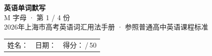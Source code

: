\documentclass[10pt,a4paper]{article}
\begin{document}
\pagestyle{plain}

\begin{center}
{\LARGE\bfseries 英语单词默写}\\[0.22em]
{\large M 字母 · 第 1 / 4 份}\\[0.18em]
{\small 2026年上海市高考英语词汇用法手册 · 参照普通高中英语课程标准}
\end{center}

\vspace{0.25em}
\noindent\begin{tabular}{@{}p{}@{}p{}@{}p{}@{}}
姓名：\underline{\hspace{2.0cm}} & 日期：\underline{\hspace{2.0cm}} & 得分：\underline{\hspace{1.3cm}}\,/\,50 \\
\end{tabular}

\vspace{0.3em}

\vspace{0.08em}
\end{document}
